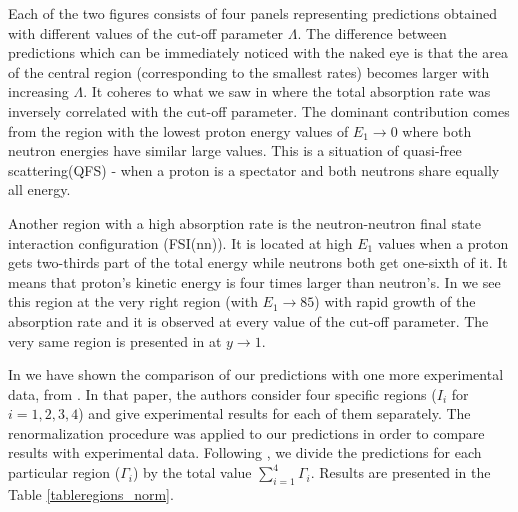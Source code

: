     Each of the two figures consists of four panels representing predictions obtained with different 
    values of the cut-off parameter $\Lambda$. The difference between predictions which can be immediately
    noticed with the naked eye is that the area of the central region (corresponding to the smallest rates)
    becomes larger with increasing $\Lambda$. It coheres to what we saw in 
    where the total absorption rate was inversely correlated with the cut-off parameter. The dominant contribution
    comes from the region with the lowest proton energy values of $E_1 \rightarrow 0$ where both neutron energies 
    have similar large values.
    This is a situation of quasi-free scattering(QFS) - when a proton is a spectator and both neutrons share equally all energy. 

    Another region with a high absorption rate is the neutron-neutron final state interaction configuration (FSI(nn)).
    It is located at high $E_1$ values when a proton gets two-thirds part of the total energy while neutrons both get
    one-sixth of it.
    It means that proton's kinetic energy is four times larger than neutron's.
    In  we see this region at the very right region (with $E_1 \rightarrow 85$)
    with rapid growth of the absorption rate and it is observed at every value of the cut-off parameter. The very same region 
    is presented in   at $y \rightarrow 1$.

    In \cite{golak_pion} we have shown the comparison of our predictions with one more experimental data,
    from \cite{Gotta1995}. In that paper, the authors consider four specific regions ($I_i$ for $i=1,2,3,4$) and give experimental results
    for each of them separately. The renormalization procedure was applied to our predictions in order to compare results with experimental data. Following \cite{Gotta1995}, we divide the predictions for each particular region ($\Gamma_i$) by the total value $\sum_{i=1}^{4}\Gamma_i$. Results are presented in the Table \ref{tableregions_norm}.

